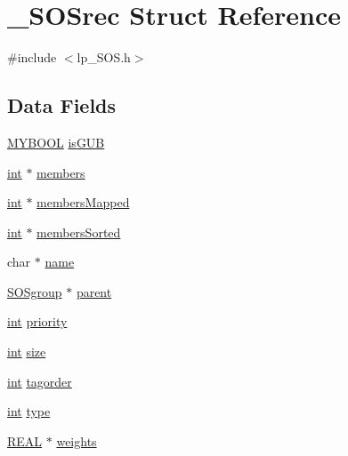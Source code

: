\hypertarget{struct___s_o_srec}{}\section{\+\_\+\+S\+O\+Srec Struct Reference}
\label{struct___s_o_srec}


{\ttfamily \#include $<$lp\+\_\+\+S\+O\+S.\+h$>$}

\subsection*{Data Fields}
\begin{DoxyCompactItemize}
\item 
\hyperlink{lp__lib_8h_aad848328fb3018217ac9f01d97b6bd88}{M\+Y\+B\+O\+OL} \hyperlink{struct___s_o_srec_af23bd61635c417a03ea00bf06706fa85}{is\+G\+UB}
\item 
\hyperlink{lp__lib_8h_adeb9ec6400320e4923ac9d836d509ddb}{int} $\ast$ \hyperlink{struct___s_o_srec_a8ec1810d712b4792b082dd3d3c818a10}{members}
\item 
\hyperlink{lp__lib_8h_adeb9ec6400320e4923ac9d836d509ddb}{int} $\ast$ \hyperlink{struct___s_o_srec_a654838be26e24bfe593d3b5eb371ae4c}{members\+Mapped}
\item 
\hyperlink{lp__lib_8h_adeb9ec6400320e4923ac9d836d509ddb}{int} $\ast$ \hyperlink{struct___s_o_srec_aac2bb4f59fae5c769f36f4cb8858ee16}{members\+Sorted}
\item 
char $\ast$ \hyperlink{struct___s_o_srec_a65d4e554a9fba0536d23a3260b221c84}{name}
\item 
\hyperlink{lp___s_o_s_8h_a77017c95c4c26fbb24166d827204ef4b}{S\+O\+Sgroup} $\ast$ \hyperlink{struct___s_o_srec_a59fb6ccd8f76553fce6c359da23dd41e}{parent}
\item 
\hyperlink{lp__lib_8h_adeb9ec6400320e4923ac9d836d509ddb}{int} \hyperlink{struct___s_o_srec_ab978fc536161357787eccac065a8e52e}{priority}
\item 
\hyperlink{lp__lib_8h_adeb9ec6400320e4923ac9d836d509ddb}{int} \hyperlink{struct___s_o_srec_a4a8a762e6b6a7f210f51c6af51a49d38}{size}
\item 
\hyperlink{lp__lib_8h_adeb9ec6400320e4923ac9d836d509ddb}{int} \hyperlink{struct___s_o_srec_ac55360fcdbcbd6a220b517c5f8ca40fa}{tagorder}
\item 
\hyperlink{lp__lib_8h_adeb9ec6400320e4923ac9d836d509ddb}{int} \hyperlink{struct___s_o_srec_a43c05db591c2d375a8697bcaffb8f6c7}{type}
\item 
\hyperlink{lp__lib_8h_a92bd5e363d131fa73669358edb232dce}{R\+E\+AL} $\ast$ \hyperlink{struct___s_o_srec_a57901e1d53a519dee2410c74346c3645}{weights}
\end{DoxyCompactItemize}


